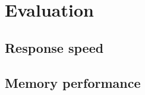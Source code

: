 \chapter{Evaluation}
\label{ch:evaluation}

\lipsum[1]

\section{Response speed}

\lipsum[2]

\section{Memory performance}

\lipsum[3]
